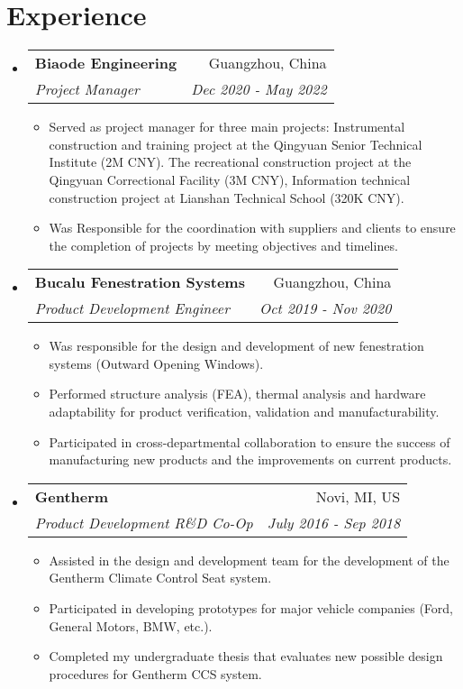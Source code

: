 \documentclass[letterpaper,10.8pt]{article}
\makeatletter
\newcommand{\resumeSubheading}[4]{
  \vspace{-1pt}\item
    \begin{tabular*}{0.97\textwidth}{l@{\extracolsep{\fill}}r}
      \textbf{#1} & #2 \\
      \textit{\small#3} & \textit{\small #4} \\
    \end{tabular*}\vspace{-5pt}
}
\newcommand{\resumeSubHeadingListStart}{\begin{itemize}[leftmargin=*]}
\newcommand{\resumeSubHeadingListEnd}{\end{itemize}}
\newcommand{\resumeItemListStart}{\begin{itemize}}
\newcommand{\resumeItemListEnd}{\end{itemize}\vspace{-5pt}}
\makeatother
\begin{document}
\section{Experience}
    \resumeSubHeadingListStart
    \resumeSubheading
    {Biaode Engineering}{Guangzhou, China}
    {Project Manager}{Dec 2020 - May 2022}
    \resumeItemListStart
        \item
          {Served as project manager for three main projects: Instrumental construction and training project at the Qingyuan Senior Technical Institute (2M CNY). The recreational construction project at the Qingyuan Correctional Facility (3M CNY), Information technical construction project at Lianshan Technical School (320K CNY).}
          \item Was Responsible for the coordination with suppliers and clients to ensure the completion of projects by meeting objectives and timelines.
      \resumeItemListEnd
      
    \resumeSubheading
		{Bucalu Fenestration Systems}{Guangzhou, China}
		{Product Development Engineer}{Oct 2019 - Nov 2020}
		\resumeItemListStart
        \item Was responsible for the design and development of new fenestration systems (Outward Opening Windows).
        \item Performed structure analysis (FEA), thermal analysis and hardware adaptability for product verification, validation and manufacturability. 
        \item Participated in cross-departmental collaboration to ensure the success of  manufacturing new products and the improvements on current products.
		\resumeItemListEnd

    \resumeSubheading
    {Gentherm}{Novi, MI, US}
    {Product Development R\&D Co-Op}{July 2016 - Sep 2018}
    \resumeItemListStart
    \item Assisted in the design and development team for the development of the Gentherm Climate Control Seat system. 
    \item Participated in developing prototypes for major vehicle companies (Ford, General Motors, BMW, etc.).
    \item Completed my undergraduate thesis that evaluates new possible design procedures for Gentherm CCS system. 
    \resumeItemListEnd
\resumeSubHeadingListEnd

\end{document}

